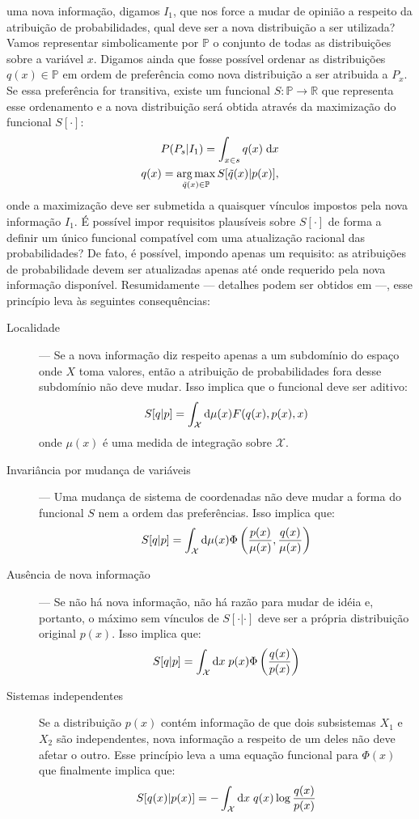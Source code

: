  uma nova informação, digamos $I_1$, que nos force a mudar de opinião a respeito da atribuição de probabilidades, qual deve ser a nova distribuição a ser utilizada? Vamos representar simbolicamente por $\mathbb{P}$ o conjunto de todas as distribuições sobre a variável $x$. Digamos ainda que fosse possível ordenar as distribuições $q(x) \in \mathbb{P}$ em ordem de preferência como nova distribuição a ser atribuida a $P_x$. Se essa preferência for transitiva, existe um funcional $S:\mathbb{P}\to\mathbb{R}$ que representa esse ordenamento e a nova distribuição será obtida através da maximização do funcional $S[\cdot]$:
\begin{align}
 P(P_{s} | I_{1}) = \int_{x\in s} q(x)\;\mathrm{d} x \nonumber \\
 q(x) = \operatorname*{arg\,max}_{\tilde{q}(x) \in \mathbb{P}} S[\tilde{q}(x) | p(x)], \nonumber
\end{align}
onde a maximização deve ser submetida a quaisquer vínculos impostos pela nova informação $I_1$. É possível impor requisitos plausíveis sobre $S[\cdot]$ de forma a definir um único funcional compatível com uma atualização racional das probabilidades? De fato, é possível, impondo apenas um requisito: as atribuições de probabilidade devem ser atualizadas apenas até onde requerido pela nova informação disponível. Resumidamente --- detalhes podem ser obtidos em \citet{ACaticha2008} ---, esse princípio leva às seguintes consequências:
\begin{description}
\item[Localidade] --- Se a nova informação diz respeito apenas a um subdomínio do espaço onde $X$ toma valores, então a atribuição de probabilidades fora desse subdomínio não deve mudar. Isso implica que o funcional deve ser aditivo:
    \[
     S[q | p] = \int_{\mathcal{X}} \mathrm{d}\mu(x) F(q(x), p(x), x)
    \]
    onde $\mu(x)$ é uma medida de integração sobre $\mathcal{X}$. 
\item[Invariância por mudança de variáveis] --- Uma mudança de sistema de coordenadas não deve mudar a forma do funcional $S$ nem a ordem das preferências. Isso implica que:
    \[
     S[q | p] = \int_{\mathcal{X}} \mathrm{d}\mu(x) \Phi\left(\frac{p(x)}{\mu(x)},\frac{q(x)}{\mu(x)}\right)
    \]
\item[Ausência de nova informação] --- Se não há nova informação, não há razão para mudar de idéia e, portanto, o máximo sem vínculos de $S[\cdot|\cdot]$ deve ser a própria distribuição original $p(x)$. Isso implica que:
    \[
     S[q | p] = \int_{\mathcal{X}} \mathrm{d} x\; p(x) \Phi\left(\frac{q(x)}{p(x)}\right) 
    \]
\item[Sistemas independentes] 
    Se a distribuição $p(x)$ contém informação de que dois subsistemas $X_1$ e $X_2$ são independentes, nova informação a respeito de um deles não deve afetar o outro. Esse princípio leva a uma equação funcional para $\Phi(x)$ que finalmente implica que:
    \begin{equation}
      \label{eq:relel}
      S[q(x) | p(x)] =  - \int_{\mathcal{X}} \ud x\; q(x) \log\frac{q(x)}{p(x)}
    \end{equation}
\end{description}

